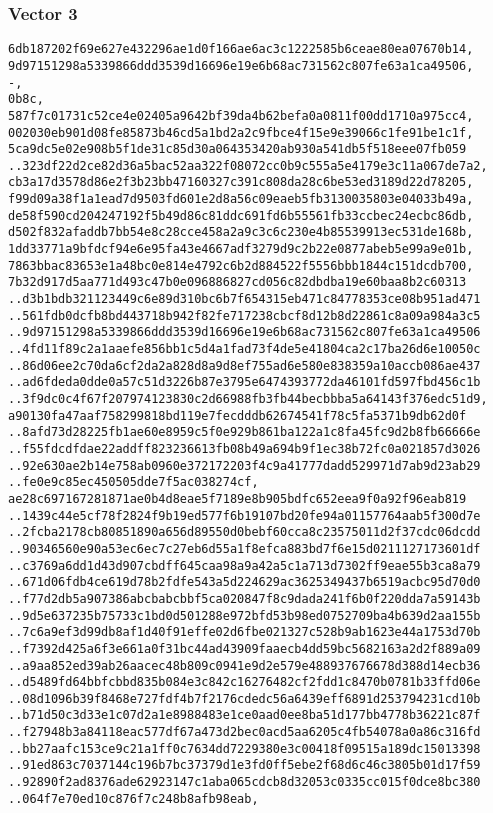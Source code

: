 \documentclass[
]{article}
\begin{document}
\hypertarget{vector-3-2}{%
\subsubsection{Vector 3}\label{vector-3-2}}

\begin{verbatim}
6db187202f69e627e432296ae1d0f166ae6ac3c1222585b6ceae80ea07670b14,
9d97151298a5339866ddd3539d16696e19e6b68ac731562c807fe63a1ca49506,
-,
0b8c,
587f7c01731c52ce4e02405a9642bf39da4b62befa0a0811f00dd1710a975cc4,
002030eb901d08fe85873b46cd5a1bd2a2c9fbce4f15e9e39066c1fe91be1c1f,
5ca9dc5e02e908b5f1de31c85d30a064353420ab930a541db5f518eee07fb059
..323df22d2ce82d36a5bac52aa322f08072cc0b9c555a5e4179e3c11a067de7a2,
cb3a17d3578d86e2f3b23bb47160327c391c808da28c6be53ed3189d22d78205,
f99d09a38f1a1ead7d9503fd601e2d8a56c09eaeb5fb3130035803e04033b49a,
de58f590cd204247192f5b49d86c81ddc691fd6b55561fb33ccbec24ecbc86db,
d502f832afaddb7bb54e8c28cce458a2a9c3c6c230e4b85539913ec531de168b,
1dd33771a9bfdcf94e6e95fa43e4667adf3279d9c2b22e0877abeb5e99a9e01b,
7863bbac83653e1a48bc0e814e4792c6b2d884522f5556bbb1844c151dcdb700,
7b32d917d5aa771d493c47b0e096886827cd056c82dbdba19e60baa8b2c60313
..d3b1bdb321123449c6e89d310bc6b7f654315eb471c84778353ce08b951ad471
..561fdb0dcfb8bd443718b942f82fe717238cbcf8d12b8d22861c8a09a984a3c5
..9d97151298a5339866ddd3539d16696e19e6b68ac731562c807fe63a1ca49506
..4fd11f89c2a1aaefe856bb1c5d4a1fad73f4de5e41804ca2c17ba26d6e10050c
..86d06ee2c70da6cf2da2a828d8a9d8ef755ad6e580e838359a10accb086ae437
..ad6fdeda0dde0a57c51d3226b87e3795e6474393772da46101fd597fbd456c1b
..3f9dc0c4f67f207974123830c2d66988fb3fb44becbbba5a64143f376edc51d9,
a90130fa47aaf758299818bd119e7fecdddb62674541f78c5fa5371b9db62d0f
..8afd73d28225fb1ae60e8959c5f0e929b861ba122a1c8fa45fc9d2b8fb66666e
..f55fdcdfdae22addff823236613fb08b49a694b9f1ec38b72fc0a021857d3026
..92e630ae2b14e758ab0960e372172203f4c9a41777dadd529971d7ab9d23ab29
..fe0e9c85ec450505dde7f5ac038274cf,
ae28c697167281871ae0b4d8eae5f7189e8b905bdfc652eea9f0a92f96eab819
..1439c44e5cf78f2824f9b19ed577f6b19107bd20fe94a01157764aab5f300d7e
..2fcba2178cb80851890a656d89550d0bebf60cca8c23575011d2f37cdc06dcdd
..90346560e90a53ec6ec7c27eb6d55a1f8efca883bd7f6e15d0211127173601df
..c3769a6dd1d43d907cbdff645caa98a9a42a5c1a713d7302ff9eae55b3ca8a79
..671d06fdb4ce619d78b2fdfe543a5d224629ac3625349437b6519acbc95d70d0
..f77d2db5a907386abcbabcbbf5ca020847f8c9dada241f6b0f220dda7a59143b
..9d5e637235b75733c1bd0d501288e972bfd53b98ed0752709ba4b639d2aa155b
..7c6a9ef3d99db8af1d40f91effe02d6fbe021327c528b9ab1623e44a1753d70b
..f7392d425a6f3e661a0f31bc44ad43909faaecb4dd59bc5682163a2d2f889a09
..a9aa852ed39ab26aacec48b809c0941e9d2e579e488937676678d388d14ecb36
..d5489fd64bbfcbbd835b084e3c842c16276482cf2fdd1c8470b0781b33ffd06e
..08d1096b39f8468e727fdf4b7f2176cdedc56a6439eff6891d253794231cd10b
..b71d50c3d33e1c07d2a1e8988483e1ce0aad0ee8ba51d177bb4778b36221c87f
..f27948b3a84118eac577df67a473d2bec0acd5aa6205c4fb54078a0a86c316fd
..bb27aafc153ce9c21a1ff0c7634dd7229380e3c00418f09515a189dc15013398
..91ed863c7037144c196b7bc37379d1e3fd0ff5ebe2f68d6c46c3805b01d17f59
..92890f2ad8376ade62923147c1aba065cdcb8d32053c0335cc015f0dce8bc380
..064f7e70ed10c876f7c248b8afb98eab,
\end{verbatim}
\end{document}
